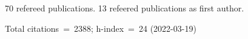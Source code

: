 70 refereed publications. 13 refeered publications as first author.

Total citations~=~2388; h-index~=~24 (2022-03-19)